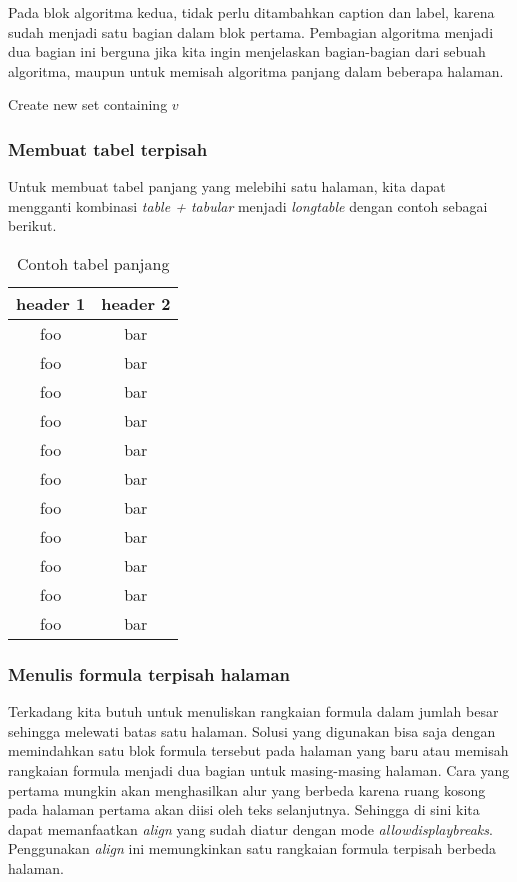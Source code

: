 Pada blok algoritma kedua, tidak perlu ditambahkan caption dan label, karena sudah menjadi satu bagian dalam blok pertama. Pembagian algoritma menjadi dua bagian ini berguna jika kita ingin menjelaskan bagian-bagian dari sebuah algoritma, maupun untuk memisah algoritma panjang dalam beberapa halaman.

\begin{algorithm}                     
	\begin{algorithmic} [1]                   
		\State Create new set containing $v$
		\EndProcedure
	\end{algorithmic}
\end{algorithm}


\subsubsection{Membuat tabel terpisah}

Untuk membuat tabel panjang yang melebihi satu halaman, kita dapat mengganti kombinasi \textit{table + tabular} menjadi \textit{longtable} dengan contoh sebagai berikut.

\begin{longtable}{| c | c |} 
	\caption{Contoh tabel panjang}
	\label{tab:myfirstlongtable} \\
	\hline
	header 1 & header 2 \\
	\hline \hline
	foo & bar \\ \hline 
	foo & bar \\ \hline
	foo & bar \\ \hline
	foo & bar \\ \hline
	foo & bar \\ \hline
	foo & bar \\ \hline
	foo & bar \\ \hline
	foo & bar \\ \hline
	foo & bar \\ \hline
	foo & bar \\ \hline
	foo & bar \\ \hline
\end{longtable}


\subsubsection{Menulis formula terpisah halaman}

Terkadang kita butuh untuk menuliskan rangkaian formula dalam jumlah besar sehingga melewati batas satu halaman. Solusi yang digunakan bisa saja dengan memindahkan satu blok formula tersebut pada halaman yang baru atau memisah rangkaian formula menjadi dua bagian untuk masing-masing halaman. Cara yang pertama mungkin akan menghasilkan alur yang berbeda karena ruang kosong pada halaman pertama akan diisi oleh teks selanjutnya. Sehingga di sini kita dapat memanfaatkan \textit{align} yang sudah diatur dengan mode \textit{allowdisplaybreaks}. Penggunakan \textit{align} ini memungkinkan satu rangkaian formula terpisah berbeda halaman. 


